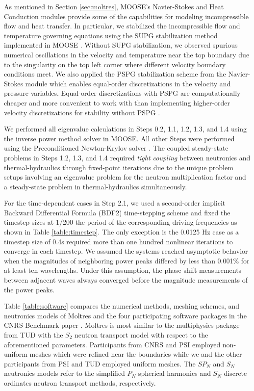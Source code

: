 As mentioned in Section \ref{sec:moltres}, \gls{MOOSE}'s Navier-Stokes
and Heat Conduction modules provide some of the capabilities for
modeling incompressible flow and heat transfer. In particular, we stabilized
the incompressible flow and temperature governing equations using the
\gls{SUPG} stabilization method implemented in \gls{MOOSE}
\citep{peterson_overview_2018}. Without \gls{SUPG} stabilization, we
observed spurious numerical oscillations in the velocity and temperature near
the top boundary due to the singularity on the top left corner where different
velocity boundary conditions meet. We also applied the \gls{PSPG} stabilization
scheme \citep{hughes_new_1986} from the Navier-Stokes module
\citep{peterson_overview_2018}
which enables equal-order discretizations in the velocity and pressure
variables. Equal-order discretizations with \gls{PSPG} are computationally
cheaper and more convenient to work with than implementing higher-order
velocity discretizations for stability without \gls{PSPG}
\citep{chapelle_inf-sup_1993}.

We performed all eigenvalue calculations in Steps 0.2, 1.1, 1.2, 1.3, and 1.4
using the inverse power method solver in \gls{MOOSE}. All other Steps
were performed using the Preconditioned Newton-Krylov solver
\citep{gaston_physics-based_2015}. The coupled steady-state problems in
Steps 1.2, 1.3, and 1.4 required \textit{tight coupling} between neutronics
and thermal-hydraulics through fixed-point iterations due to the unique problem
setups involving an eigenvalue problem for the neutron multiplication factor
and a steady-state problem in thermal-hydraulics simultaneously.

For the time-dependent cases in Step 2.1, we used a second-order
implicit Backward Differential Formula (BDF2) time-stepping scheme and fixed
the timestep sizes at 1/200 the period of the corresponding driving
frequencies as shown in Table \ref{table:timestep}. The only exception is the
0.0125 Hz case as a timestep size of 0.4s required more than one hundred
nonlinear iterations to converge in each timestep. We assumed the systems
reached asymptotic behavior when the magnitudes of neighboring power peaks
differed by less than 0.001\% for at least ten wavelengths. Under this
assumption, the phase shift measurements between adjacent waves always
converged before the magnitude measurements of the power peaks.

Table \ref{table:software} compares the numerical methods, meshing schemes, and
neutronics models of Moltres and the four participating software packages in
the CNRS Benchmark paper \citep{tiberga_results_2020}. Moltres is most similar
to the multiphysics package from TUD with the $S_2$ neutron transport model
with respect to the aforementioned parameters. Participants from CNRS and PSI
employed non-uniform meshes which were refined near the boundaries while we and
the other participants from PSI and TUD employed uniform meshes. The $SP_N$ and
$S_N$ neutronics models refer to the simplified $P_N$ spherical harmonics and
$S_N$ discrete ordinates neutron transport methods, respectively.


